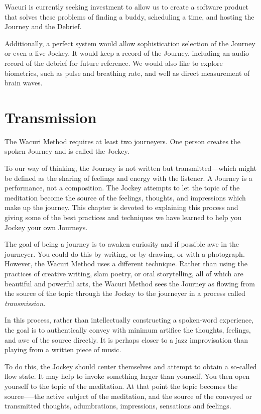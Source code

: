 \documentclass[12pt]{book}
\begin{document}
Wacuri is currently seeking investment to allow us to create a software
product that solves these problems of finding a buddy, scheduling a time,
and hosting the Journey and the Debrief.

Additionally, a perfect system would allow sophistication selection of
the Journey or even a live Jockey. It would keep a record of the Journey,
including an audio record of the debrief for future reference. We would
also like to explore biometrics, such as pulse and breathing rate, and
well as direct measurement of brain waves.


\chapter{Transmission}


The Wacuri Method requires at least two journeyers. One person creates the spoken Journey and is called the Jockey.
					
To our way of thinking, the Journey is not written but transmitted---which
might be defined as the sharing of feelings and energy with the listener. A Journey is a performance, not a composition.
The Jockey attempts to let the topic of the meditation become the source of the feelings, thoughts,
and impressions which make up the journey.
This chapter is devoted to explaining this process and giving some of the best practices
and techniques we have learned to help you Jockey your own Journeys.
					
The goal of being a journey is to awaken curiosity and if possible awe in the journeyer.
You could do this by writing, or by drawing, or with a photograph.
However, the Wacuri Method uses a different technique. Rather than using the practices of creative writing,
slam poetry, or oral storytelling, all of which are beautiful and powerful arts, the Wacuri Method sees the Journey
as flowing from the source of the topic through the Jockey to the journeyer in a process called {\em transmission}.
					
In this process, rather than intellectually constructing a spoken-word experience, the goal is to authentically convey with minimum artifice the thoughts, feelings, and awe of the source directly. It is perhaps closer to a jazz improvisation than playing from a written piece of music.
					
To do this, the Jockey should center themselves and attempt to obtain a so-called flow state. It may help to invoke something larger than yourself. You then open yourself to the topic of the meditation. At that point the topic becomes the source--—the active subject of the meditation, and the source of the conveyed or transmitted thoughts, adumbrations, impressions, sensations and feelings.
\end{document}

